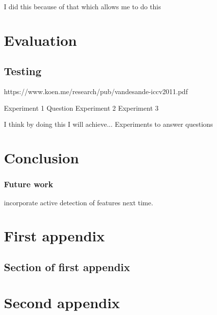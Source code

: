 \documentclass{mproj}
\begin{document}
I did this because of that which allows me to do this

\chapter{Evaluation}
\section{Testing}
https://www.koen.me/research/pub/vandesande-iccv2011.pdf

Experiment 1
Question
Experiment 2
Experiment 3


I think by doing this I will achieve...
Experiments to answer questions

\chapter{Conclusion}\label{conclusion}
\subsection{Future work}

incorporate active detection of features next time.

\appendix %
\chapter{First appendix}

\section{Section of first appendix}

\chapter{Second appendix}



\end{document}
